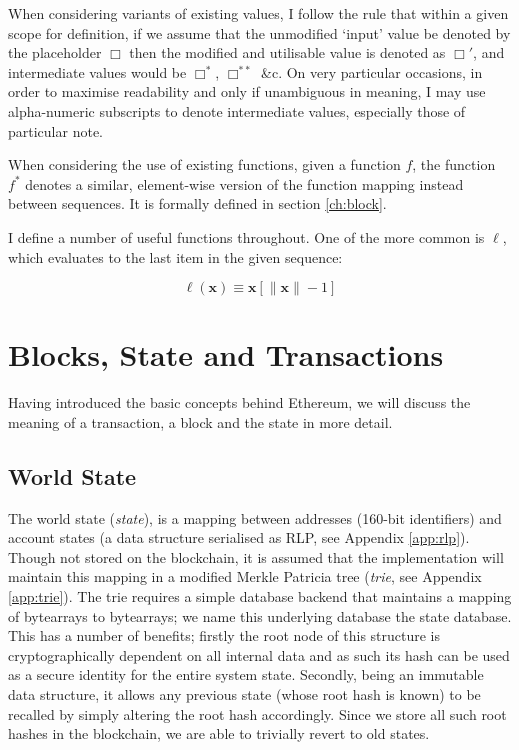 \documentclass[9pt,oneside]{amsart}
\begin{document}
\begin{multicols}{2}
When considering variants of existing values, I follow the rule that within a given scope for definition, if we assume that the unmodified `input' value be denoted by the placeholder $\Box$ then the modified and utilisable value is denoted as $\Box'$, and intermediate values would be $\Box^*$,  $\Box^{**}$ \&c. On very particular occasions, in order to maximise readability and only if unambiguous in meaning, I may use alpha-numeric subscripts to denote intermediate values, especially those of particular note.

When considering the use of existing functions, given a function $f$, the function $f^*$ denotes a similar, element-wise version of the function mapping instead between sequences. It is formally defined in section \ref{ch:block}.

I define a number of useful functions throughout. One of the more common is $\ell$, which evaluates to the last item in the given sequence:

\begin{equation}
\ell(\mathbf{x}) \equiv \mathbf{x}[\lVert \mathbf{x} \rVert - 1]
\end{equation}

\section{Blocks, State and Transactions} \label{ch:bst}

Having introduced the basic concepts behind Ethereum, we will discuss the meaning of a transaction, a block and the state in more detail.

\subsection{World State} \label{ch:state}

The world state (\textit{state}), is a mapping between addresses (160-bit identifiers) and account states (a data structure serialised as RLP, see Appendix \ref{app:rlp}). Though not stored on the blockchain, it is assumed that the implementation will maintain this mapping in a modified Merkle Patricia tree (\textit{trie}, see Appendix \ref{app:trie}). The trie requires a simple database backend that maintains a mapping of bytearrays to bytearrays; we name this underlying database the state database. This has a number of benefits; firstly the root node of this structure is cryptographically dependent on all internal data and as such its hash can be used as a secure identity for the entire system state. Secondly, being an immutable data structure, it allows any previous state (whose root hash is known) to be recalled by simply altering the root hash accordingly. Since we store all such root hashes in the blockchain, we are able to trivially revert to old states.


\end{multicols}
\end{document}
